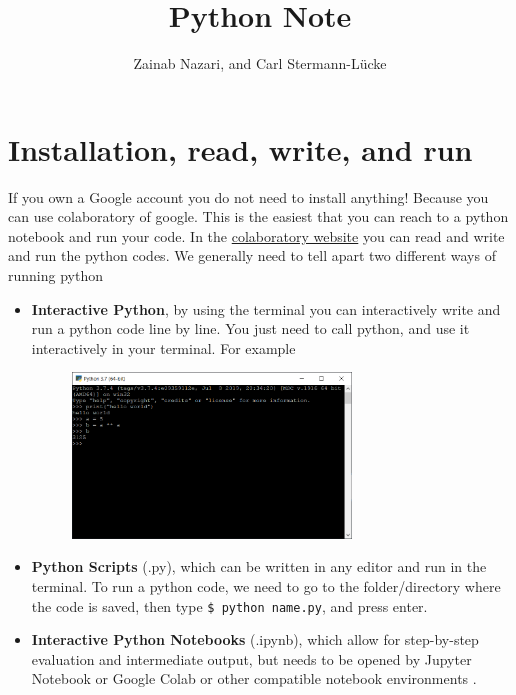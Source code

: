 \documentclass[10pt,a4paper]{article}
\author{Zainab Nazari, and Carl Stermann-L\"ucke}
\title{Python Note}
\date{}
\begin{document}
\maketitle
\tableofcontents












\section{Installation, read, write, and run}
If you own a Google account you do not need to install anything! Because you can use colaboratory of google. This is the easiest that you can reach to a python notebook and run your code.
In the   \href{https://colab.research.google.com}{colaboratory website}  you can read and write and run the python codes.
We generally need to tell apart two different ways of running python
\begin{itemize}
\item \textbf{Interactive Python}, by using the terminal you can interactively write and run a python code line by line. You just need to call python, and use it interactively in your terminal. For example
\begin{figure}[h]\centering
\includegraphics[width=0.7\textwidth]{interactive-python-terminal.PNG}
\end{figure}
\item \textbf{Python Scripts} (.py), which can be written in any editor and run in the terminal. To run a python code, we need to go to the folder/directory where the code is saved, then type \texttt{\$ python name.py}, and press enter. 
\item \textbf{Interactive Python Notebooks} (.ipynb), which allow for step-by-step evaluation and intermediate output, but needs to be opened by Jupyter Notebook or Google Colab or other compatible notebook environments .
\end{itemize}
\end{document}
